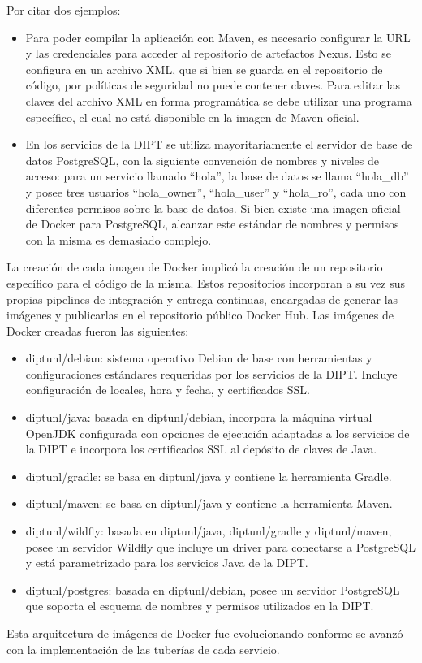 Por citar dos ejemplos:

\begin{itemize}
\item Para poder compilar la aplicación con Maven, es necesario configurar la URL y las credenciales para acceder al repositorio de artefactos Nexus. Esto se configura en un archivo XML, que si bien se guarda en el repositorio de código, por políticas de seguridad no puede contener claves. Para editar las claves del archivo XML en forma programática se debe utilizar una programa específico, el cual no está disponible en la imagen de Maven oficial.
\item En los servicios de la DIPT se utiliza mayoritariamente el servidor de base de datos PostgreSQL, con la siguiente convención de nombres y niveles de acceso: para un servicio llamado “hola”, la base de datos se llama “hola\_db” y posee tres usuarios “hola\_owner”, “hola\_user” y “hola\_ro”, cada uno con diferentes permisos sobre la base de datos. Si bien existe una imagen oficial de Docker para PostgreSQL, alcanzar este estándar de nombres y permisos con la misma es demasiado complejo.
\end{itemize}
La creación de cada imagen de Docker implicó la creación de un repositorio específico para el código de la misma. Estos repositorios incorporan a su vez sus propias pipelines de integración y entrega continuas, encargadas de generar las imágenes y publicarlas en el repositorio público Docker Hub. Las imágenes de Docker creadas fueron las siguientes:

\begin{itemize}
\item diptunl/debian: sistema operativo Debian de base con herramientas y configuraciones estándares requeridas por los servicios de la DIPT. Incluye configuración de locales, hora y fecha, y certificados SSL.
\item diptunl/java: basada en diptunl/debian, incorpora la máquina virtual OpenJDK configurada con opciones de ejecución adaptadas a los servicios de la DIPT e incorpora los certificados SSL al depósito de claves de Java.
\item diptunl/gradle: se basa en diptunl/java y contiene la herramienta Gradle.
\item diptunl/maven: se basa en diptunl/java y contiene la herramienta Maven.
\item diptunl/wildfly: basada en diptunl/java, diptunl/gradle y diptunl/maven, posee un servidor Wildfly que incluye un driver para conectarse a PostgreSQL y está parametrizado para los servicios Java de la DIPT.
\item diptunl/postgres: basada en diptunl/debian, posee un servidor PostgreSQL que soporta el esquema de nombres y permisos utilizados en la DIPT.
\end{itemize}
Esta arquitectura de imágenes de Docker fue evolucionando conforme se avanzó con la implementación de las tuberías de cada servicio.


